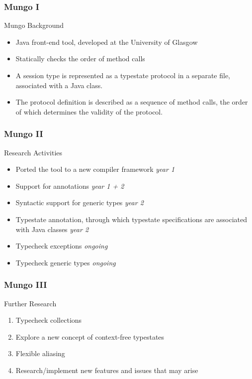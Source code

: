 \begin{frame}\frametitle{Mungo I}

  \begin{alertblock}{Mungo Background}
  \begin{itemize}
    \item Java front-end tool, developed at the University of Glasgow
    \item Statically checks the order of method calls
    \item A session type is represented as a typestate protocol in a separate file, associated with a Java class.
    \item The protocol definition is described as a sequence of method calls, the order of which determines the validity of the protocol.
  \end{itemize}
\end{alertblock}
\end{frame}


\begin{frame}\frametitle{Mungo II}

\begin{alertblock}{Research Activities}
  \begin{itemize}
    \item Ported the tool to a new compiler framework \hfill \textit{year 1}
    \item Support  for annotations  \hfill   \textit{year 1 + 2}
    \item Syntactic support for generic types  \hfill  \textit{year 2}
    \item Typestate annotation, through which typestate
  specifications are associated with Java classes  \hfill  \textit{year 2}
    \item Typecheck exceptions  \hfill  \textit{ongoing}
    \item Typecheck generic types \hfill   \textit{ongoing}
  \end{itemize}
\end{alertblock}
\end{frame}

\begin{frame}\frametitle{Mungo III}
\begin{alertblock}{Further Research}
  \begin{enumerate}
  \item Typecheck collections
  \item Explore a new concept of context-free typestates
  \item Flexible aliasing
  \item Research/implement new features and issues that may arise
\end{enumerate}

\end{alertblock}

\end{frame}
